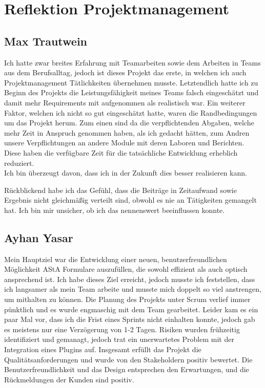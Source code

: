 \chapter{Reflektion Projektmanagement}\label{ch:reflektion-projektmanagement}


\section{Max Trautwein}

Ich hatte zwar breites Erfahrung mit Teamarbeiten sowie dem Arbeiten in Teams aus dem Berufsalltag,
jedoch ist dieses Projekt das erste, in welchen ich auch Projektmanagement Tätlichkeiten übernehmen musste.
Letztendlich hatte ich zu Beginn des Projekts die Leistungsfähigkeit meines Teams falsch eingeschätzt und
damit mehr Requirements mit aufgenommen als realistisch war.
Ein weiterer Faktor, welchen ich nicht so gut eingeschätzt hatte, waren die Randbedingungen um das Projekt herum.
Zum einen sind da die verpflichtenden Abgaben, welche mehr Zeit in Anspruch genommen haben, als ich gedacht hätten,
zum Andren unsere Verpflichtungen an andere Module mit deren Laboren und Berichten.
Diese haben die verfügbare Zeit für die tatsächliche Entwicklung erheblich reduziert.\\
Ich bin überzeugt davon, dass ich in der Zukunft dies besser realisieren kann.

Rückblickend habe ich das Gefühl, dass die Beiträge in Zeitaufwand sowie Ergebnis nicht gleichmäßig verteilt sind,
obwohl es nie an Tätigkeiten gemangelt hat.
Ich bin mir unsicher, ob ich das nennenswert beeinflussen konnte.

\section{Ayhan Yasar}
Mein Hauptziel war die Entwicklung einer neuen, benutzerfreundlichen Möglichkeit AStA Formulare auszufüllen, die sowohl effizient als auch optisch ansprechend ist. 
Ich habe dieses Ziel erreicht, jedoch musste ich feststellen, dass ich langsamer als mein Team arbeite und musste mich doppelt so viel anstrengen, um mithalten zu können.
Die Planung des Projekts unter Scrum verlief immer pünktlich und es wurde engmaschig mit dem Team gearbeitet. Leider kam es ein paar Mal vor, dass ich die Frist eines Sprints nicht einhalten konnte, 
jedoch gab es meistens nur eine Verzögerung von 1-2 Tagen. 
Risiken wurden frühzeitig identifiziert und gemanagt, jedoch trat ein unerwartetes Problem mit der Integration eines Plugins auf.
Insgesamt erfüllt das Projekt die Qualitätsanforderungen und wurde von den Stakeholdern positiv bewertet. Die Benutzerfreundlichkeit und das Design entsprechen den Erwartungen, und die Rückmeldungen der Kunden sind positiv.


